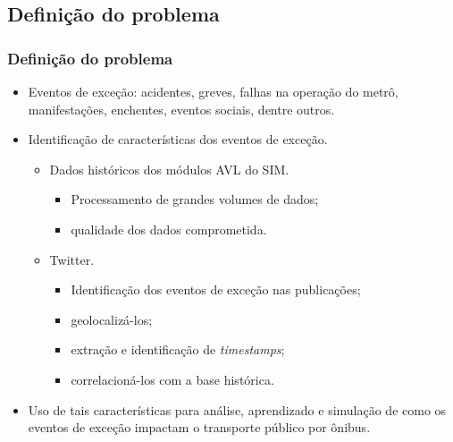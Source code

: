 \documentclass{beamer}
\begin{document}
\subsection{Definição do problema}
\begin{frame}
\frametitle{Definição do problema}
\begin{itemize}
\item Eventos de exceção: acidentes, greves, falhas na operação do metrô, manifestações, enchentes, eventos sociais, dentre outros.
\end{itemize}

\begin{itemize}
\item Identificação de características dos eventos de exceção.
\begin{itemize}
\item Dados históricos dos módulos AVL do SIM.
\begin{itemize}
\item Processamento de grandes volumes de dados;
\item qualidade dos dados comprometida.
\end{itemize}
\item Twitter.
\begin{itemize}
\item Identificação dos eventos de exceção nas publicações; 
\item geolocalizá-los; 
\item extração e identificação de \textit{timestamps};
\item correlacioná-los com a base histórica.
\end{itemize}
\end{itemize}
\end{itemize}

\begin{itemize}
\item Uso de tais características para análise, aprendizado e simulação de como os eventos de exceção impactam o transporte público por ônibus.
\end{itemize}

\end{frame}
\end{document}
